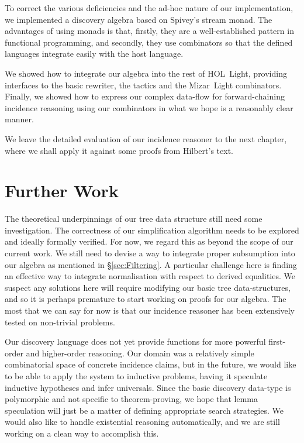 To correct the various deficiencies and the ad-hoc nature of our implementation, we implemented a discovery algebra based on Spivey's stream monad. The advantages of using monads is that, firstly, they are a well-established pattern in functional programming, and secondly, they use combinators so that the defined languages integrate easily with the host language.

We showed how to integrate our algebra into the rest of HOL~Light, providing interfaces to the basic rewriter, the tactics and the Mizar~Light combinators. Finally, we showed how to express our complex data-flow for forward-chaining incidence reasoning using our combinators in what we hope is a reasonably clear manner.

We leave the detailed evaluation of our incidence reasoner to the next chapter, where we shall apply it against some proofs from Hilbert's text.

\section{Further Work}
The theoretical underpinnings of our tree data structure still need some investigation. The correctness of our simplification algorithm needs to be explored and ideally formally verified. For now, we regard this as beyond the scope of our current work. We still need to devise a way to integrate proper subsumption into our algebra as mentioned in \S\ref{sec:Filtering}. A particular challenge here is finding an effective way to integrate normalisation with respect to derived equalities. We suspect any solutions here will require modifying our basic tree data-structures, and so it is perhaps premature to start working on proofs for our algebra. The most that we can say for now is that our incidence reasoner has been extensively tested on non-trivial problems.

Our discovery language does not yet provide functions for more powerful first-order and higher-order reasoning. Our domain was a relatively simple combinatorial space of concrete incidence claims, but in the future, we would like to be able to apply the system to inductive problems, having it speculate inductive hypotheses and infer universals. Since the basic discovery data-type is polymorphic and not specific to theorem-proving, we hope that lemma speculation will just be a matter of defining appropriate search strategies. We would also like to handle existential reasoning automatically, and we are still working on a clean way to accomplish this. 


